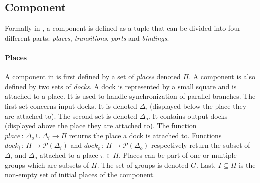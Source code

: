 \subsection{Component}

Formally in \mad, a component is defined as a tuple that can be divided
into four different parts: \emph{places}, \emph{transitions}, \emph{ports} and
\emph{bindings}.

\paragraph{Places}{

A component in \mad is first defined by a set of \emph{places} denoted
$\Pi$. A component is also defined by two sets of
\emph{docks}. A dock is represented by a small square and is attached to a
place. It is used to handle synchronization of parallel branches. The
first set concerns input docks. It is denoted $\Delta_{i}$
(displayed below the place they are attached to). The second set is
denoted $\Delta_{o}$. It contains output docks (displayed above
the place they are attached to).
The function $place\,:\,\Delta_{o}\cup\Delta_{i}\rightarrow\Pi$
returns the place a dock is attached to. Functions
$dock_i\,:\,\Pi\rightarrow \mathcal{P}(\Delta_{i})$ and
$dock_o\,:\,\Pi\rightarrow \mathcal{P}(\Delta_{o})$ respectively
return the subset of $\Delta_i$ and $\Delta_o$ attached to a place
$\pi\in\Pi$. Places can be part of one or multiple groups which are
subsets of $\Pi$. The set of groups is denoted $G$. Last, $I \subseteq \Pi$ is the
non-empty set of initial places of the component.

}

